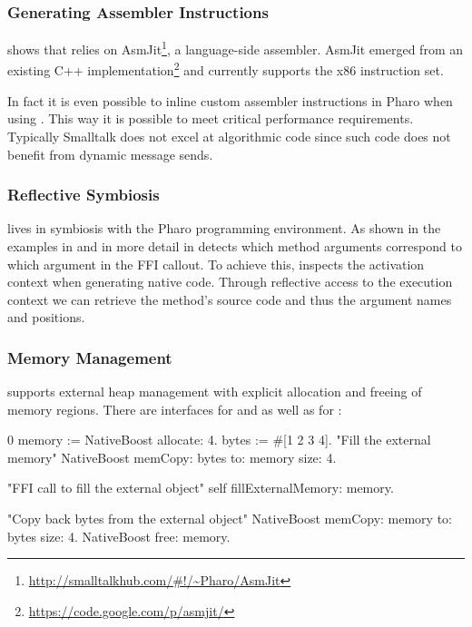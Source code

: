 \subsubsection{Generating Assembler Instructions}

 shows that \NB relies on AsmJit\footnote{\url{http://smalltalkhub.com/\#!/~Pharo/AsmJit}}, a language-side assembler.
AsmJit emerged from an existing C++ implementation\footnote{\url{https://code.google.com/p/asmjit/}} and currently supports the x86 instruction set.

In fact it is even possible to inline custom assembler instructions in Pharo when using \NB.
This way it is possible to meet critical performance requirements.
Typically Smalltalk does not excel at algorithmic code since such code does not benefit from dynamic message sends.

\subsubsection{Reflective Symbiosis}

\NB lives in symbiosis with the Pharo programming environment.
As shown in the examples in  and in more detail in  \NB detects which method arguments correspond to which argument in the FFI callout.
To achieve this, \NB inspects the activation context when generating native code.
Through reflective access to the execution context we can retrieve the method's source code and thus the argument names and positions.

\subsubsection{Memory Management}


\NB supports external heap management with explicit allocation and freeing of memory regions.
There are interfaces for  and  as well as for :
%
\begin{stcode}[
	label={lst:externalHeap},
	caption={Example of external heap management in \NB}]{0}
memory := NativeBoost allocate: 4.
bytes  := #[1 2 3 4].
"Fill the external memory"
NativeBoost memCopy: bytes to: memory size: 4.

"FFI call to fill the external object"
self fillExternalMemory: memory.

"Copy back bytes from the external object"
NativeBoost memCopy: memory to: bytes size: 4.
NativeBoost free: memory.
\end{stcode}

